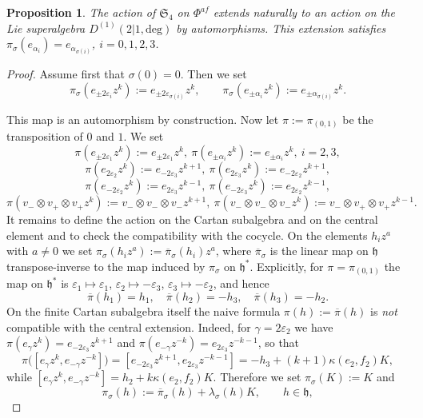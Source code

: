 \documentclass[10pt]{amsart}
\newtheorem{proposition}[theorem]{Proposition}
\newcommand{\fh}{{\mathfrak h}}
\newcommand{\Daff}{D^{(1)}(2|1,\mathrm{deg})}
\begin{document}
	\begin{proposition}
		The action of $\mathfrak{S}_4$ on $\Phi^{af}$ extends naturally to an action on the Lie superalgebra $\Daff$ by automorphisms. This extension satisfies
		$\pi_\sigma(e_{\alpha_i})=e_{\alpha_{\sigma(i)}}$, $i=0,1,2,3$.
	\end{proposition}
	\begin{proof}
		Assume first that $\sigma(0)=0$. Then we set
		\[\pi_\sigma(e_{\pm 2 \varepsilon_i}z^k):=e_{\pm 2 \varepsilon_{\sigma(i)}}z^k,\qquad \pi_\sigma(e_{\pm \alpha_i}z^k):=e_{\pm \alpha_{\sigma(i)}}z^k.\]
		
		This map is an automorphism by construction. Now let $\pi:=\pi_{(0,1)}$ be the transposition of $0$ and $1$. We set
		\[\pi(e_{\pm 2 \varepsilon_1}z^k):=e_{\pm 2 \varepsilon_1}z^k,~\pi(e_{\pm \alpha_i}z^k):=e_{\pm \alpha_i}z^k,~i=2,3,\]
		\[\pi(e_{2 \varepsilon_2}z^k):=e_{-2 \varepsilon_3}z^{k+1},~\pi(e_{2 \varepsilon_3}z^k):=e_{-2 \varepsilon_2}z^{k+1},\]
		\[\pi(e_{-2 \varepsilon_2}z^k):=e_{2 \varepsilon_3}z^{k-1},~\pi(e_{-2 \varepsilon_3}z^k):=e_{2 \varepsilon_2}z^{k-1},\]
		\[\pi(v_- \otimes v_+ \otimes v_+ z^k):=v_- \otimes v_- \otimes v_- z^{k+1},~\pi(v_- \otimes v_- \otimes v_- z^k):=v_- \otimes v_+ \otimes v_+ z^{k-1}.\]
		It remains to define the action on the Cartan subalgebra and on the central element and to check the compatibility with the cocycle. On the elements $h_iz^a$ with $a \neq 0$ we set $\pi_\sigma(h_iz^a):=\overline{\pi}_\sigma(h_i)z^a$, where $\overline{\pi}_\sigma$ is the linear map on $\fh$ transpose-inverse to the map induced by $\pi_\sigma$ on $\fh^*$. Explicitly, for $\pi=\pi_{(0,1)}$ the map on $\fh^*$ is $\varepsilon_1 \mapsto \varepsilon_1$, $\varepsilon_2 \mapsto -\varepsilon_3$, $\varepsilon_3 \mapsto -\varepsilon_2$, and hence
		\[\overline{\pi}(h_1)=h_1,\quad \overline{\pi}(h_2)=-h_3,\quad \overline{\pi}(h_3)=-h_2.\]
		On the finite Cartan subalgebra itself the naive formula $\pi(h):=\overline{\pi}(h)$ is {\it not} compatible with the central extension. Indeed, for $\gamma=2\varepsilon_2$ we have $\pi(e_{\gamma}z^k)=e_{-2\varepsilon_3}z^{k+1}$ and $\pi(e_{-\gamma}z^{-k})=e_{2\varepsilon_3}z^{-k-1}$, so that
		\[\pi\bigl([e_{\gamma}z^k,e_{-\gamma}z^{-k}]\bigr)=[e_{-2\varepsilon_3}z^{k+1},e_{2\varepsilon_3}z^{-k-1}]=-h_3+(k+1)\kappa(e_2,f_2)K,\]
		while $[e_\gamma z^k,e_{-\gamma}z^{-k}]=h_2+k\kappa(e_2,f_2)K$. Therefore we set $\pi_\sigma(K):=K$ and
		\begin{equation*}\label{eq:PiOnCartan}
			\pi_\sigma(h):=\overline{\pi}_\sigma(h)+\lambda_\sigma(h)K,\qquad h \in \fh,

\end{equation*}
\end{proof}
\end{document}
